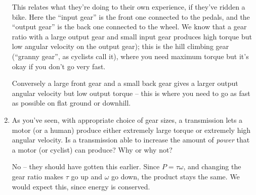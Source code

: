 \documentclass[12pt]{article}
\begin{document}
\begin{enumerate}
{\color{red} This relates what they're doing to their own experience, if they've ridden a bike. Here the ``input gear'' is the front one connected to the pedals, and the ``output gear'' is the back one connected to the wheel. We know that a gear ratio with a large output gear and small input gear produces high torque but low angular velocity on the output gear); this is the hill climbing gear (``granny gear'', as cyclists call it), where you need maximum torque but it's okay if you don't go very fast.
	
Conversely a large front gear and a small back gear gives a larger output angular velocity but low output torque -- this is where you need to go as fast as possible on flat ground or downhill.}

\item As you've seen, with appropriate choice of gear sizes, a transmission lets a motor (or a human) produce either extremely large torque or extremely high angular velocity. Is a transmission able to increase the amount of {\it power} that a motor (or cyclist) can produce? Why or why not?

{\color{red}
	No -- they should have gotten this earlier. Since $P = \tau \omega$, and changing the gear ratio makes $\tau$ go up and $\omega$ go down, the product stays the same. We would expect this, since energy is conserved.
}
	



\end{enumerate}

\newpage
\end{document}
